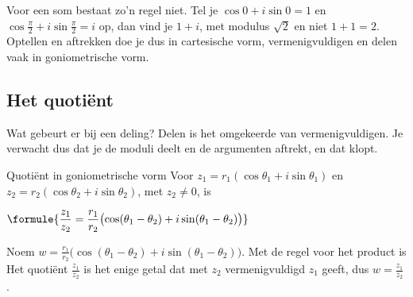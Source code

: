 
Voor een som bestaat zo'n regel niet. Tel je $\cos 0 + i\sin 0 = 1$ en $\cos\frac{\pi}{2} + i\sin\frac{\pi}{2} = i$ op, dan vind je $1 + i$, met modulus $\sqrt2$ en niet $1 + 1 = 2$. Optellen en aftrekken doe je dus in cartesische vorm, vermenigvuldigen en delen vaak in goniometrische vorm.

\subsection{Het quotiënt}

Wat gebeurt er bij een deling? Delen is het omgekeerde van vermenigvuldigen. Je verwacht dus dat je de moduli deelt en de argumenten aftrekt, en dat klopt.

\begin{theorie}
\begin{stelling}{Quotiënt in goniometrische vorm}
Voor $z_1 = r_1(\cos\theta_1 + i\sin\theta_1)$ en $z_2 = r_2(\cos\theta_2 + i\sin\theta_2)$, met $z_2 \neq 0$, is

\vspace{1mm}
\qquad $\formule{\dfrac{z_1}{z_2} = \dfrac{r_1}{r_2} \bigl(\cos(\theta_1 - \theta_2) + i\sin(\theta_1 - \theta_2)\bigr)}$
\end{stelling}

\begin{bewijs}
Noem $w = \frac{r_1}{r_2}\bigl(\cos(\theta_1 - \theta_2) + i\sin(\theta_1 - \theta_2)\bigr)$. Met de regel voor het product is
Het quotiënt $\frac{z_1}{z_2}$ is het enige getal dat met $z_2$ vermenigvuldigd $z_1$ geeft, dus $w = \frac{z_1}{z_2}$.
\end{bewijs}
\end{theorie}

